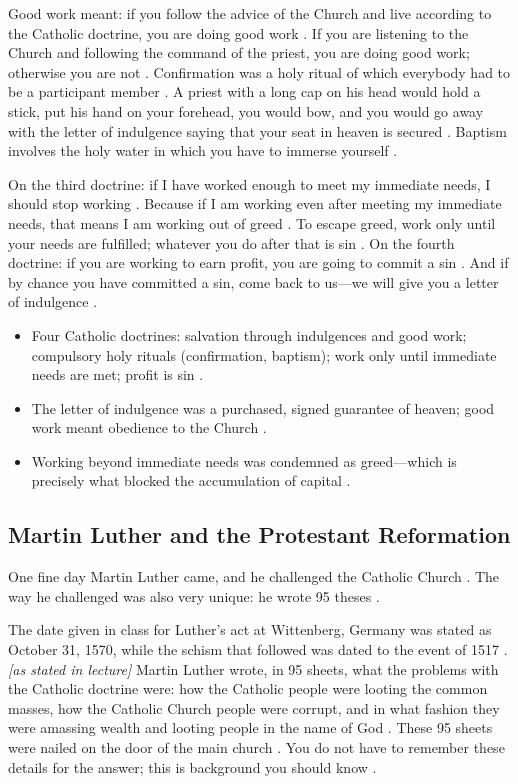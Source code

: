 Good work meant: if you follow the advice of the Church and live according to the Catholic doctrine, you are doing good work . If you are listening to the Church and following the command of the priest, you are doing good work; otherwise you are not .
Confirmation was a holy ritual of which everybody had to be a participant member . A priest with a long cap on his head would hold a stick, put his hand on your forehead, you would bow, and you would go away with the letter of indulgence saying that your seat in heaven is secured .
Baptism involves the holy water in which you have to immerse yourself .

On the third doctrine: if I have worked enough to meet my immediate needs, I should stop working . Because if I am working even after meeting my immediate needs, that means I am working out of greed . To escape greed, work only until your needs are fulfilled; whatever you do after that is sin .
On the fourth doctrine: if you are working to earn profit, you are going to commit a sin . And if by chance you have committed a sin, come back to us---we will give you a letter of indulgence .

\begin{QuickRevision}
\begin{itemize}
    \item Four Catholic doctrines: salvation through indulgences and good work; compulsory holy rituals (confirmation, baptism); work only until immediate needs are met; profit is sin .
    \item The letter of indulgence was a purchased, signed guarantee of heaven; good work meant obedience to the Church .
    \item Working beyond immediate needs was condemned as greed---which is precisely what blocked the accumulation of capital .
\end{itemize}
\end{QuickRevision}

\subsection{Martin Luther and the Protestant Reformation}
One fine day Martin Luther came, and he challenged the Catholic Church . The way he challenged was also very unique: he wrote 95 theses .

\begin{GovtPolicy}
The date given in class for Luther's act at Wittenberg, Germany was stated as October 31, 1570, while the schism that followed was dated to the event of 1517 . \textit{[as stated in lecture]}
Martin Luther wrote, in 95 sheets, what the problems with the Catholic doctrine were: how the Catholic people were looting the common masses, how the Catholic Church people were corrupt, and in what fashion they were amassing wealth and looting people in the name of God .
These 95 sheets were nailed on the door of the main church .
You do not have to remember these details for the answer; this is background you should know .
\end{GovtPolicy}

